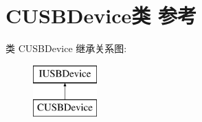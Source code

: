 \hypertarget{class_c_u_s_b_device}{}\section{C\+U\+S\+B\+Device类 参考}
\label{class_c_u_s_b_device}
类 C\+U\+S\+B\+Device 继承关系图\+:\begin{figure}[H]
\begin{center}
\leavevmode
\includegraphics[height=2.000000cm]{class_c_u_s_b_device}
\end{center}
\end{figure}
